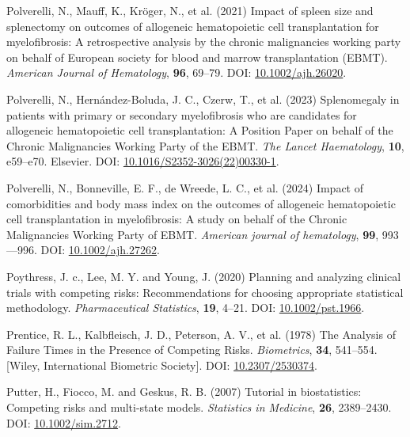 \documentclass[
  letterpaper,
  paper=240mm:170mm,
  twoside=true,
  open=right,
  fontsize=10pt,
  pagesize=false,
  BCOR=15mm,
  DIV=14,
  headinclude=true,
  footinclude=false,
  headsepline=on]{scrbook}
\newlength{\cslhangindent}
\newenvironment{CSLReferences}[2] %
 {\begin{list}{}{%
  \setlength{\itemindent}{0pt}
  \setlength{\leftmargin}{0pt}
  \setlength{\parsep}{0pt}
  \ifodd #1
   \setlength{\leftmargin}{\cslhangindent}
   \setlength{\itemindent}{-1\cslhangindent}
  \fi
  \setlength{\itemsep}{#2\baselineskip}}}
 {\end{list}}
\begin{document}
\begin{CSLReferences}{1}{1}
Polverelli, N., Mauff, K., Kröger, N., et al. (2021) Impact of spleen
size and splenectomy on outcomes of allogeneic hematopoietic cell
transplantation for myelofibrosis: {A} retrospective analysis by the
chronic malignancies working party on behalf of {European} society for
blood and marrow transplantation ({EBMT}). \emph{American Journal of
Hematology}, \textbf{96}, 69--79. DOI:
\href{https://doi.org/10.1002/ajh.26020}{10.1002/ajh.26020}.

Polverelli, N., Hernández-Boluda, J. C., Czerw, T., et al. (2023)
Splenomegaly in patients with primary or secondary myelofibrosis who are
candidates for allogeneic hematopoietic cell transplantation: A
{Position Paper} on behalf of the {Chronic Malignancies Working Party}
of the {EBMT}. \emph{The Lancet Haematology}, \textbf{10}, e59--e70.
Elsevier. DOI:
\href{https://doi.org/10.1016/S2352-3026(22)00330-1}{10.1016/S2352-3026(22)00330-1}.

Polverelli, N., Bonneville, E. F., de Wreede, L. C., et al. (2024)
Impact of comorbidities and body mass index on the outcomes of
allogeneic hematopoietic cell transplantation in myelofibrosis: {A}
study on behalf of the {Chronic Malignancies Working Party} of {EBMT}.
\emph{American journal of hematology}, \textbf{99}, 993---996. DOI:
\href{https://doi.org/10.1002/ajh.27262}{10.1002/ajh.27262}.

Poythress, J. c., Lee, M. Y. and Young, J. (2020) Planning and analyzing
clinical trials with competing risks: {Recommendations} for choosing
appropriate statistical methodology. \emph{Pharmaceutical Statistics},
\textbf{19}, 4--21. DOI:
\href{https://doi.org/10.1002/pst.1966}{10.1002/pst.1966}.

Prentice, R. L., Kalbfleisch, J. D., Peterson, A. V., et al. (1978) The
{Analysis} of {Failure Times} in the {Presence} of {Competing Risks}.
\emph{Biometrics}, \textbf{34}, 541--554. {[}Wiley, International
Biometric Society{]}. DOI:
\href{https://doi.org/10.2307/2530374}{10.2307/2530374}.

Putter, H., Fiocco, M. and Geskus, R. B. (2007) Tutorial in
biostatistics: Competing risks and multi-state models. \emph{Statistics
in Medicine}, \textbf{26}, 2389--2430. DOI:
\href{https://doi.org/10.1002/sim.2712}{10.1002/sim.2712}.


\end{CSLReferences}
\end{document}
